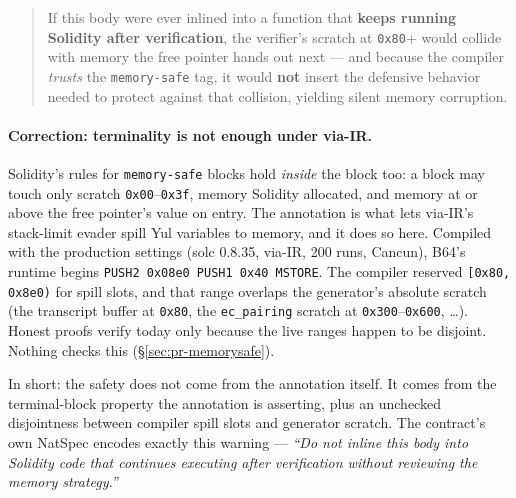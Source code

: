 \begin{quote}
If this body were ever inlined into a function that \textbf{keeps running
Solidity after verification}, the verifier's scratch at \texttt{0x80}+
would collide with memory the free pointer hands out next --- and because
the compiler \emph{trusts} the \texttt{memory-safe} tag, it would
\textbf{not} insert the defensive behavior needed to protect against
that collision, yielding silent memory corruption.
\end{quote}

\paragraph{Correction: terminality is not enough under via-IR.}
Solidity's rules for \texttt{memory-safe} blocks hold \emph{inside} the
block too: a block may touch only scratch \texttt{0x00}--\texttt{0x3f},
memory Solidity allocated, and memory at or above the free pointer's value
on entry. The annotation is what lets via-IR's stack-limit evader spill Yul
variables to memory, and it does so here. Compiled with the production
settings (solc 0.8.35, via-IR, 200 runs, Cancun), B64's runtime begins
\texttt{PUSH2 0x08e0 PUSH1 0x40 MSTORE}. The compiler reserved
\texttt{[0x80, 0x8e0)} for spill slots, and that range overlaps the
generator's absolute scratch (the transcript buffer at \texttt{0x80}, the
\texttt{ec\_pairing} scratch at \texttt{0x300}--\texttt{0x600}, \ldots).
Honest proofs verify today only because the live ranges happen to be
disjoint. Nothing checks this (\S\ref{sec:pr-memorysafe}).

In short: the safety does not come from the annotation itself. It comes
from the terminal-block property the annotation is asserting, plus an
unchecked disjointness between compiler spill slots and generator
scratch. The contract's
own NatSpec encodes exactly this warning --- \emph{``Do not inline this
body into Solidity code that continues executing after verification
without reviewing the memory strategy.''}

